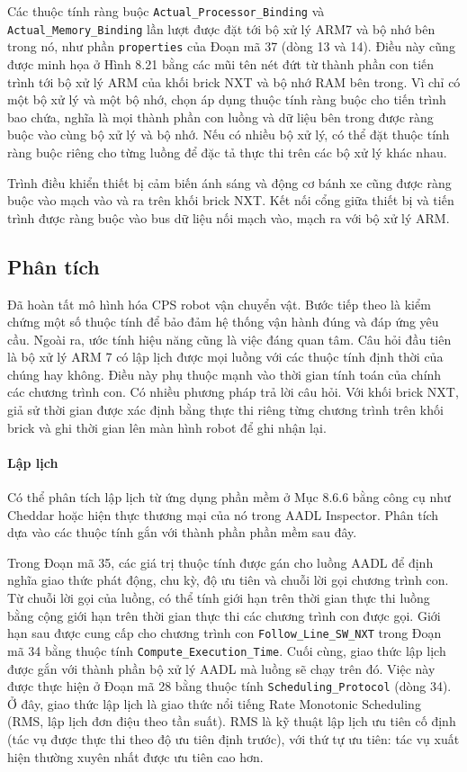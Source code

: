 Các thuộc tính ràng buộc \texttt{Actual\_Processor\_Binding} và \texttt{Actual\_Memory\_Binding} lần lượt được đặt tới bộ xử lý ARM7 và bộ nhớ bên trong nó, như phần \texttt{properties} của Đoạn mã 37 (dòng 13 và 14). Điều này cũng được minh họa ở Hình 8.21 bằng các mũi tên nét đứt từ thành phần con tiến trình tới bộ xử lý ARM của khối brick NXT và bộ nhớ RAM bên trong. Vì chỉ có một bộ xử lý và một bộ nhớ, chọn áp dụng thuộc tính ràng buộc cho tiến trình bao chứa, nghĩa là mọi thành phần con luồng và dữ liệu bên trong được ràng buộc vào cùng bộ xử lý và bộ nhớ. Nếu có nhiều bộ xử lý, có thể đặt thuộc tính ràng buộc riêng cho từng luồng để đặc tả thực thi trên các bộ xử lý khác nhau.

Trình điều khiển thiết bị cảm biến ánh sáng và động cơ bánh xe cũng được ràng buộc vào mạch vào và ra trên khối brick NXT. Kết nối cổng giữa thiết bị và tiến trình được ràng buộc vào bus dữ liệu nối mạch vào, mạch ra với bộ xử lý ARM.

\subsection{Phân tích}
Đã hoàn tất mô hình hóa CPS robot vận chuyển vật. Bước tiếp theo là kiểm chứng một số thuộc tính để bảo đảm hệ thống vận hành đúng và đáp ứng yêu cầu. Ngoài ra, ước tính hiệu năng cũng là việc đáng quan tâm. Câu hỏi đầu tiên là bộ xử lý ARM 7 có lập lịch được mọi luồng với các thuộc tính định thời của chúng hay không. Điều này phụ thuộc mạnh vào thời gian tính toán của chính các chương trình con. Có nhiều phương pháp trả lời câu hỏi. Với khối brick NXT, giả sử thời gian được xác định bằng thực thi riêng từng chương trình trên khối brick và ghi thời gian lên màn hình robot để ghi nhận lại.

\paragraph{Lập lịch}
Có thể phân tích lập lịch từ ứng dụng phần mềm ở Mục 8.6.6 bằng công cụ như Cheddar hoặc hiện thực thương mại của nó trong AADL Inspector. Phân tích dựa vào các thuộc tính gắn với thành phần phần mềm sau đây.

Trong Đoạn mã 35, các giá trị thuộc tính được gán cho luồng AADL để định nghĩa giao thức phát động, chu kỳ, độ ưu tiên và chuỗi lời gọi chương trình con. Từ chuỗi lời gọi của luồng, có thể tính giới hạn trên thời gian thực thi luồng bằng cộng giới hạn trên thời gian thực thi các chương trình con được gọi. Giới hạn sau được cung cấp cho chương trình con \texttt{Follow\_Line\_SW\_NXT} trong Đoạn mã 34 bằng thuộc tính \texttt{Compute\_Execution\_Time}. Cuối cùng, giao thức lập lịch được gắn với thành phần bộ xử lý AADL mà luồng sẽ chạy trên đó. Việc này được thực hiện ở Đoạn mã 28 bằng thuộc tính \texttt{Scheduling\_Protocol} (dòng 34). Ở đây, giao thức lập lịch là giao thức nổi tiếng Rate Monotonic Scheduling (RMS, lập lịch đơn điệu theo tần suất). RMS là kỹ thuật lập lịch ưu tiên cố định (tác vụ được thực thi theo độ ưu tiên định trước), với thứ tự ưu tiên: tác vụ xuất hiện thường xuyên nhất được ưu tiên cao hơn.

